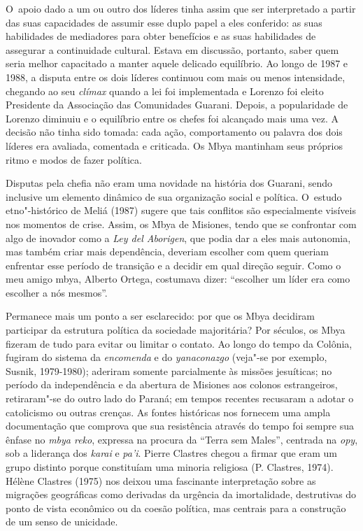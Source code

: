 O~apoio dado a um ou outro dos líderes tinha assim que ser interpretado
a partir das suas capacidades de assumir esse duplo papel a eles
conferido: as suas habilidades de mediadores para obter benefícios e as
suas habilidades de assegurar a continuidade cultural. Estava em
discussão, portanto, saber quem seria melhor capacitado a manter aquele
delicado equilíbrio. Ao longo de 1987 e 1988, a disputa entre os dois
líderes continuou com mais ou menos intensidade, chegando ao seu \emph{clímax}
quando a lei foi implementada e Lorenzo foi eleito Presidente da
Associação das Comunidades Guarani. Depois, a popularidade de Lorenzo
diminuiu e o equilíbrio entre os chefes foi alcançado mais uma vez. A
decisão não tinha sido tomada: cada ação, comportamento ou palavra dos
dois líderes era avaliada, comentada e criticada. Os Mbya mantinham
seus próprios ritmo e modos de fazer política. 

Disputas pela chefia não eram uma novidade na história dos Guarani,
sendo inclusive um elemento dinâmico de sua organização social e
política. O~estudo etno"-histórico de Meliá (1987) sugere que tais
conflitos são especialmente visíveis nos momentos de crise. Assim, os
Mbya de Misiones, tendo que se confrontar com algo de inovador como a
\emph{Ley del Aborigen}, que podia dar a eles mais autonomia, mas também criar
mais dependência, deveriam escolher com quem queriam enfrentar esse
período de transição e a decidir em qual direção seguir. Como o meu
amigo mbya, Alberto Ortega, costumava dizer: ``escolher um líder era
como escolher a nós mesmos''.

Permanece mais um ponto a ser esclarecido: por que os Mbya decidiram
participar da estrutura política da sociedade majoritária? Por séculos,
os Mbya fizeram de tudo para evitar ou limitar o contato. Ao longo do
tempo da Colônia, fugiram do sistema da \emph{encomenda} e do \emph{yanaconazgo}
(veja"-se por exemplo, Susnik, 1979-1980); aderiram somente parcialmente
às missões jesuíticas; no período da independência e da abertura de
Misiones aos colonos estrangeiros, retiraram"-se do outro lado do
Paraná; em tempos recentes recusaram a adotar o catolicismo ou outras
crenças. As fontes históricas nos fornecem uma ampla documentação que
comprova que sua resistência através do tempo foi sempre sua ênfase no
\emph{mbya reko}, expressa na procura da ``Terra sem Males'', centrada na \emph{opy},
sob a liderança dos \emph{karai} e \emph{pa’i}. Pierre Clastres chegou a firmar que
eram um grupo distinto porque constituíam uma minoria religiosa (P.
Clastres, 1974). Hélène Clastres (1975) nos deixou uma fascinante
interpretação sobre as migrações geográficas como derivadas da urgência
da imortalidade, destrutivas do ponto de vista econômico ou da coesão
política, mas centrais para a construção de um senso de unicidade. 

